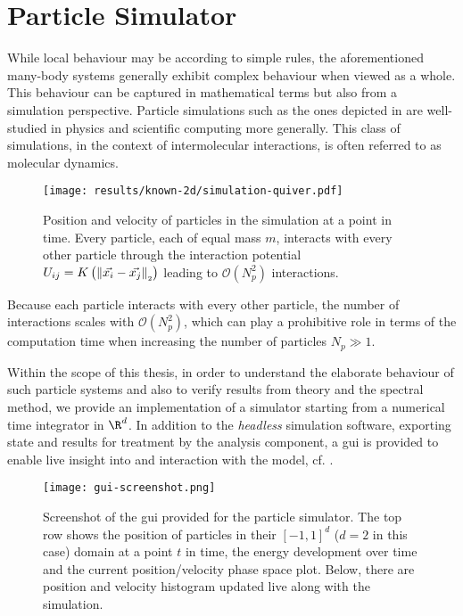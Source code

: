 \chapter{Particle Simulator}
\label{chap:particle-simulator}

While local behaviour may be according to simple rules, the aforementioned many-body systems generally exhibit complex behaviour when viewed as a whole.
This behaviour can be captured in mathematical terms but also from a simulation perspective.
Particle simulations such as the ones depicted in  are well-studied in physics and scientific computing more generally.
This class of simulations, in the context of intermolecular interactions, is often referred to as molecular dynamics.

\begin{figure}[H]
  \centering
  \texttt{[image: results/known-2d/simulation-quiver.pdf]}
  \caption[Quiver plot of 120 particles in 2D interacting through the attractive-repulsive potential]{Position and velocity of particles in the simulation at a point in time. Every particle, each of equal mass $m$, interacts with every other particle through the interaction potential $U_{ij} = K\left(\left\lVert\vec{x_i} - \vec{x_j}\right\rVert_{\scriptscriptstyle 2}\right)$ leading to $\mathcal{O}(N_p^2)$ interactions.}
  \label{fig:simulation-quiver}
\end{figure}

Because each particle interacts with every other particle, the number of interactions scales with $\mathcal{O}(N_p^2)$,
which can play a prohibitive role in terms of the computation time when increasing the number of particles $N_p \gg 1$.

Within the scope of this thesis, in order to understand the elaborate behaviour of such particle systems and also to verify results from theory and the spectral method, we provide an implementation of a simulator starting from a numerical time integrator in $\R^d$.
In addition to the \textit{headless} simulation software, exporting state and results for treatment by the analysis component, a \gls{gui} is provided to enable live insight into and interaction with the model, cf. .

\begin{figure}[H]
  \centering
  \texttt{[image: gui-screenshot.png]}
  \caption[Graphical User Interface of the Simulator]{Screenshot of the \gls{gui} provided for the particle simulator. The top row shows the position of particles in their $[-1, 1]^d$ ($d = 2$ in this case) domain at a point $t$ in time, the energy development over time and the current position/velocity phase space plot. Below, there are position and velocity histogram updated live along with the simulation.}
  \label{fig:gui-screenshot}
\end{figure}

